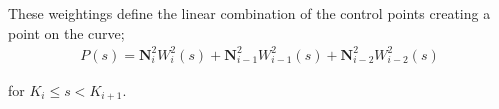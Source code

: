 These weightings define the linear combination of the control points creating a point on the curve;
\begin{align*}
P(s) = \textbf{N}_i^2W^2_{i}(s) + \textbf{N}_{i-1}^2W^2_{i-1}(s) + \textbf{N}_{i-2}^2W^2_{i-2}(s)
\end{align*}

for $K_i \leq s < K_{i+1}$.
